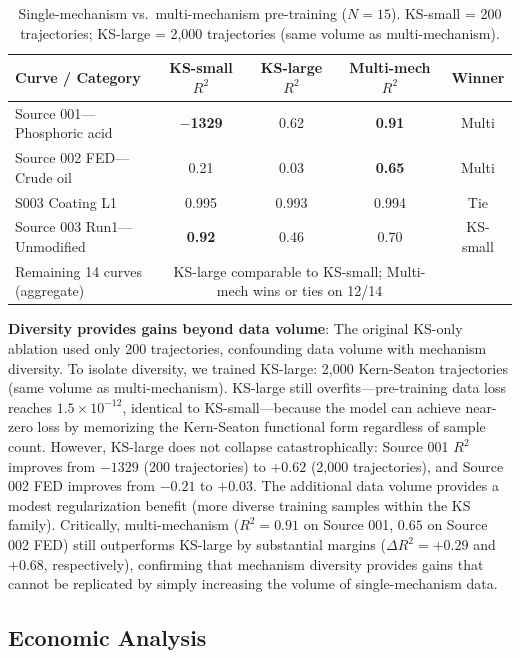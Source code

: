 \documentclass[review]{elsarticle}
\begin{document}
\begin{table}[htbp]
\centering
\caption{Single-mechanism vs.\ multi-mechanism pre-training ($N=15$). KS-small = 200 trajectories; KS-large = 2,000 trajectories (same volume as multi-mechanism).}
\label{tab:single_vs_multi}
\begin{tabular}{@{}p{3.5cm}cccc@{}}
\toprule
Curve / Category & KS-small $R^2$ & KS-large $R^2$ & Multi-mech $R^2$ & Winner \\
\midrule
Source 001---Phosphoric acid & \textbf{$-$1329} & 0.62 & \textbf{0.91} & Multi \\
Source 002 FED---Crude oil & 0.21 & 0.03 & \textbf{0.65} & Multi \\
S003 Coating L1 & 0.995 & 0.993 & 0.994 & Tie \\
Source 003 Run1---Unmodified & \textbf{0.92} & 0.46 & 0.70 & KS-small \\
\addlinespace
Remaining 14 curves (aggregate) & \multicolumn{3}{c}{KS-large comparable to KS-small; Multi-mech wins or ties on 12/14} & \\
\bottomrule
\end{tabular}
\end{table}

\textbf{Diversity provides gains beyond data volume}: The original KS-only ablation used only 200 trajectories, confounding data volume with mechanism diversity. To isolate diversity, we trained KS-large: 2,000 Kern-Seaton trajectories (same volume as multi-mechanism). KS-large still overfits---pre-training data loss reaches $1.5 \times 10^{-12}$, identical to KS-small---because the model can achieve near-zero loss by memorizing the Kern-Seaton functional form regardless of sample count. However, KS-large does not collapse catastrophically: Source 001 $R^2$ improves from $-1329$ (200 trajectories) to $+0.62$ (2,000 trajectories), and Source 002 FED improves from $-0.21$ to $+0.03$. The additional data volume provides a modest regularization benefit (more diverse training samples within the KS family). Critically, multi-mechanism ($R^2 = 0.91$ on Source 001, $0.65$ on Source 002 FED) still outperforms KS-large by substantial margins ($\Delta R^2 = +0.29$ and $+0.68$, respectively), confirming that mechanism diversity provides gains that cannot be replicated by simply increasing the volume of single-mechanism data.

\subsection{Economic Analysis}
\end{document}
